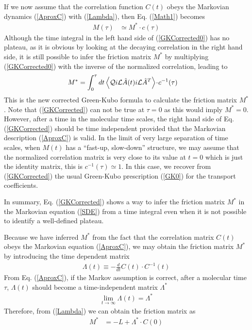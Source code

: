 \documentclass[b5paper,openright,11pt]{book}
\newcommand{\esc}{\!\cdot\!}
\newcommand{\llangle}{\left\langle}
\newcommand{\rrangle}{\right\rangle}
\begin{document}
If  we now  assume  that  the correlation  function  $C(t)$ obeys  the
Markovian   dynamics   (\ref{AproxC})    with   (\ref{Lambda}),   then
Eq. (\ref{Math1}) becomes
\begin{align}
M(\tau)&\simeq M^*\esc c(\tau)
\label{GKCorrected0}
\end{align}
Although   the   time   integral   in    the   left   hand   side   of
(\ref{GKCorrected0}) has  no plateau, as  it is obvious by  looking at
the decaying correlation in the right  hand side, it is still possible
to infer the friction matrix $M^*$ by multiplying (\ref{GKCorrected0})
with the inverse of the normalized correlation, leading to
\begin{align}
M^*&= \int_0^{\tau} dt \llangle {\cal Q} i{\cal L}\hat{A} (t)i{\cal L}\hat{A}^T\rrangle\esc  c^{-1}(\tau)
\label{GKCorrected}
\end{align}
This  is the new  corrected
Green-Kubo  formula  to  calculate  the  friction
matrix $M^*$. Note that (\ref{GKCorrected})  can not  be true at  $\tau=0$ as  this would
imply $M^*=0$.   However, after a  time in the molecular  time scales,
the  right  hand  side  of Eq.   (\ref{GKCorrected})  should  be  time
independent provided that the  Markovian description (\ref{AproxC}) is
valid.  In the limit of very large separation of time scales, when $M(t)$
 has   a  ``fast-up,  slow-down''
structure, we  may assume  that the  normalized correlation  matrix is
very close  to its value at  $t=0$ which is just  the identity matrix,
this  is  $ c^{-1}(\tau)\simeq  1$.  In  this  case, we  recover  from
(\ref{GKCorrected}) the usual  Green-Kubo prescription (\ref{GK0}) for
the transport coefficients.


In summary, Eq. (\ref{GKCorrected}) shows  a way to infer the friction
matrix  $M^*$  in  the  Markovian equation  (\ref{SDE})  from  a  time
integral  even when  it is  not  possible to  identify a  well-defined
plateau.

Because we have inferred $M^*$  from the fact that the  correlation matrix $C(t)$
obeys  the Markovian  equation  (\ref{AproxC}), we may obtain the friction matrix $M^*$
by introducing the time dependent matrix
\begin{align}
\Lambda(t)\equiv-    \frac{d}{dt}C(t)\esc C^{-1}(t)
\label{AproxCtau}
\end{align}
From Eq. (\ref{AproxC}),  if the Markov assumption is  correct, after a
molecular  time   $\tau$,  $\Lambda(t)$  should   become  a
time-independent matrix  $\Lambda^*$
\begin{align}
  \lim_{t\to \infty}\Lambda(t)=\Lambda^*
\label{toLambda*}
\end{align}
Therefore, from (\ref{Lambda}) we can obtain the friction matrix as
\begin{align}
M^*&=  -L+ \Lambda^*\esc C(0)
\label{AproxCtau0}
\end{align}
\end{document}
